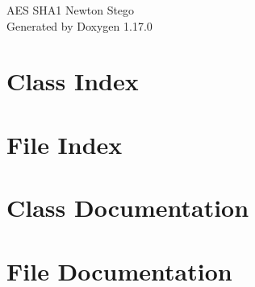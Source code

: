 \documentclass[twoside]{book}
\newcommand{\+}{\discretionary{\mbox{\scriptsize$\hookleftarrow$}}{}{}}
\newcommand{\clearemptydoublepage}{%
    \newpage{\pagestyle{empty}\cleardoublepage}%
  }
\begin{document}
  \raggedbottom
    \hypersetup{pageanchor=false,
                bookmarksnumbered=true,
                pdfencoding=unicode
               }
  \begin{titlepage}
  \vspace*{7cm}
  \begin{center}%
  {\Large AES SHA1 Newton Stego}\\
  \vspace*{1cm}
  {\large Generated by Doxygen 1.17.0}\\
  \end{center}
  \end{titlepage}
  \clearemptydoublepage
  \tableofcontents
  \clearemptydoublepage
  \hypersetup{pageanchor=true}

\chapter{Class Index}

\chapter{File Index}

\chapter{Class Documentation}


\chapter{File Documentation}

  \backmatter
  \newpage
  \clearemptydoublepage
  \printindex
\end{document}

